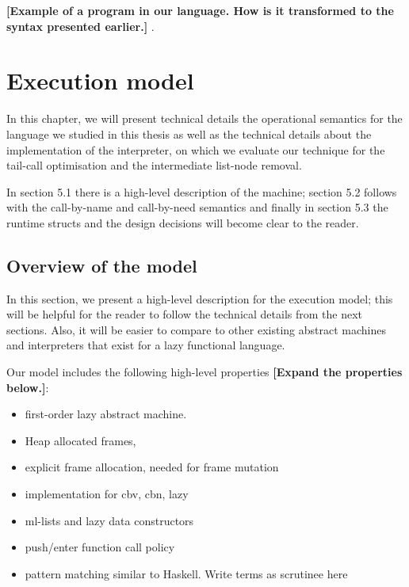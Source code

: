 \documentclass[diploma]{softlab-thesis}
\begin{document}
\textbf{[Example of a program in our language. How is it transformed to the syntax presented earlier.]} . 


\chapter {Execution model}
In this chapter, we will present technical details the operational semantics for the 
language we studied in this thesis as well as the technical details about the implementation of
the interpreter, on which we evaluate our technique for the tail-call optimisation and the intermediate
list-node removal. 
\newline 
\par In section 5.1 there is a high-level description of the machine; section 5.2 follows 
with the call-by-name and call-by-need semantics and finally in section 5.3 the runtime structs and the 
design decisions will become clear to the reader.

\section {Overview of the model}
In this section, we present a high-level description for the execution model; this will be helpful for the reader
to follow the technical details from the next sections. Also, it will be easier to compare to other existing 
abstract machines and interpreters that exist for a lazy functional language.

Our model includes the following high-level properties \textbf{[Expand the properties below.]}:
\begin{itemize}
  \item first-order lazy abstract machine.
  \item Heap allocated frames, 
  \item explicit frame allocation, needed for frame mutation 
  \item implementation for cbv, cbn, lazy
  \item ml-lists and lazy data constructors 
  \item push/enter function call policy 
  \item pattern matching similar to Haskell. Write terms as scrutinee here 
\end{itemize}
\end{document}
